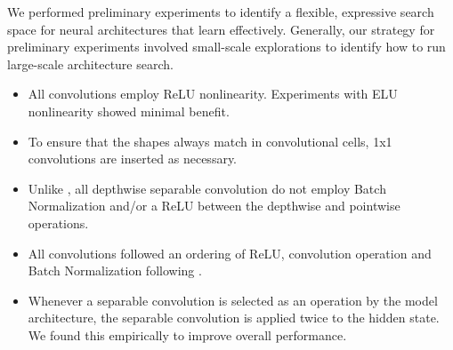 We performed preliminary experiments to identify a flexible, expressive search space for neural architectures that learn effectively. Generally, our strategy for preliminary experiments involved small-scale explorations to identify how to run large-scale architecture search.

\begin{itemize}
\item All convolutions employ ReLU nonlinearity. Experiments with ELU nonlinearity \cite{clevert2015fast} showed minimal benefit.
\item To ensure that the shapes always match in convolutional cells, 1x1 convolutions are inserted as necessary.
\item Unlike \cite{howard2017mobilenets}, all depthwise separable convolution do not employ Batch Normalization and/or a ReLU between the depthwise and pointwise operations.
\item All convolutions followed an ordering of ReLU, convolution operation and Batch Normalization following \cite{identity-mappings}.
\item Whenever a separable convolution is selected as an operation by the model architecture, the separable convolution is applied twice to the hidden state. We found this empirically to improve overall performance.
\end{itemize}





